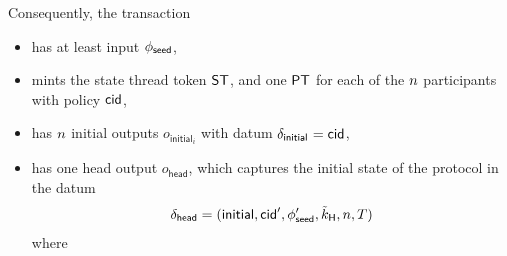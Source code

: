 \noindent Consequently, the \mtxInit{} transaction
\begin{itemize}
	\item has at least input $\phi_{\mathsf{seed}}$,
	\item mints the state thread token $\mathsf{ST}$, and one $\mathsf{PT}$ for each of the $n$
	      participants with policy $\mathsf{cid}$,
	\item has $n$ initial outputs $o_{\mathsf{initial}_{i}}$ with datum $\delta_{\mathsf{initial}_{}} = \mathsf{cid}$,
	\item has one head output
	      $o_{\mathsf{head}}$, which captures
	      the initial state of the protocol in the datum
	      \[
		      \delta_{\mathsf{head}} = (\mathsf{initial},\mathsf{cid}',\phi_{\mathsf{seed}}',\tilde{k}_{\mathsf{H}},n,T)
	      \]
	      where
\end{itemize}


